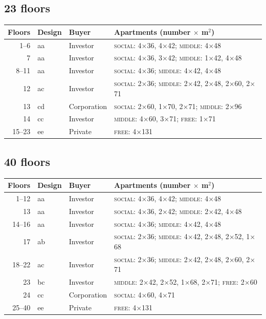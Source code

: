 \subsection*{23 floors}
\begin{tabular}{@{}r l l p{10.2cm}@{}}
\toprule
Floors & Design & Buyer & Apartments (number $\times$ m$^2$) \\
\midrule
1--6 & aa & Investor & \textsc{social}: 4$\times$36, 4$\times$42; \textsc{middle}: 4$\times$48 \\
7 & aa & Investor & \textsc{social}: 4$\times$36, 3$\times$42; \textsc{middle}: 1$\times$42, 4$\times$48 \\
8--11 & aa & Investor & \textsc{social}: 4$\times$36; \textsc{middle}: 4$\times$42, 4$\times$48 \\
12 & ac & Investor & \textsc{social}: 2$\times$36; \textsc{middle}: 2$\times$42, 2$\times$48, 2$\times$60, 2$\times$71 \\
13 & cd & Corporation & \textsc{social}: 2$\times$60, 1$\times$70, 2$\times$71; \textsc{middle}: 2$\times$96 \\
14 & cc & Investor & \textsc{middle}: 4$\times$60, 3$\times$71; \textsc{free}: 1$\times$71 \\
15--23 & ee & Private & \textsc{free}: 4$\times$131 \\
\bottomrule
\end{tabular}

\subsection*{40 floors}
\begin{tabular}{@{}r l l p{10.2cm}@{}}
\toprule
Floors & Design & Buyer & Apartments (number $\times$ m$^2$) \\
\midrule
1--12 & aa & Investor & \textsc{social}: 4$\times$36, 4$\times$42; \textsc{middle}: 4$\times$48 \\
13 & aa & Investor & \textsc{social}: 4$\times$36, 2$\times$42; \textsc{middle}: 2$\times$42, 4$\times$48 \\
14--16 & aa & Investor & \textsc{social}: 4$\times$36; \textsc{middle}: 4$\times$42, 4$\times$48 \\
17 & ab & Investor & \textsc{social}: 2$\times$36; \textsc{middle}: 4$\times$42, 2$\times$48, 2$\times$52, 1$\times$68 \\
18--22 & ac & Investor & \textsc{social}: 2$\times$36; \textsc{middle}: 2$\times$42, 2$\times$48, 2$\times$60, 2$\times$71 \\
23 & bc & Investor & \textsc{middle}: 2$\times$42, 2$\times$52, 1$\times$68, 2$\times$71; \textsc{free}: 2$\times$60 \\
24 & cc & Corporation & \textsc{social}: 4$\times$60, 4$\times$71 \\
25--40 & ee & Private & \textsc{free}: 4$\times$131 \\
\bottomrule
\end{tabular}

